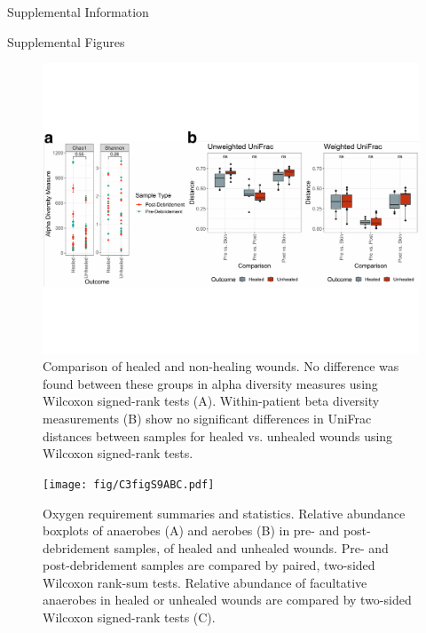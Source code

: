 \documentclass[oneside,12pt,final]{sty/ucthesis-CA2012}
\begin{document}
\begin{mainmatter}
\begin{section}{Supplemental Information}
\begin{subsection}{Supplemental Figures}
\begin{figure}[h]
\centering
\centerline{\includegraphics[width=\textwidth]{fig/C3figS8AB.pdf}}
\caption{Comparison of healed and non-healing wounds. No difference was found between these groups in alpha diversity measures using Wilcoxon signed-rank tests (A). Within-patient beta diversity measurements (B) show no significant differences in UniFrac distances between samples for healed vs. unhealed wounds using Wilcoxon signed-rank tests.}
\label{fig:S8}
\end{figure}

\begin{figure}[h]
\centering
\centerline{\texttt{[image: fig/C3figS9ABC.pdf]}}
\caption{Oxygen requirement summaries and statistics. Relative abundance boxplots of anaerobes (A) and aerobes (B) in pre- and post-debridement samples, of healed and unhealed wounds. Pre- and post-debridement samples are compared by paired, two-sided Wilcoxon rank-sum tests. Relative abundance of facultative anaerobes in healed or unhealed wounds are compared by two-sided Wilcoxon signed-rank tests (C).}
\label{fig:S9ABC}
\end{figure}


\end{subsection}
\end{section}
\end{mainmatter}
\end{document}
